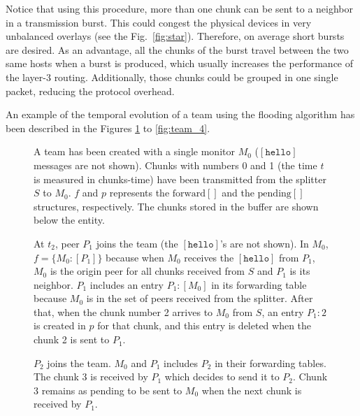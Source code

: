 Notice that using this procedure, more than one chunk can be sent to a
neighbor in a transmission burst. This could congest the physical
devices in very unbalanced overlays (see the
Fig.~\ref{fig:star}). Therefore, on average short bursts are
desired. As an advantage, all the chunks of the burst travel between
the two same hosts when a burst is produced, which usually increases
the performance of the layer-3 routing. Additionally, those chunks
could be grouped in one single packet, reducing the protocol overhead.

An example of the temporal evolution of a team using the flooding
algorithm has been described in the Figures \ref{fig:team_0} to
\ref{fig:team_4}.

\begin{figure}
  \caption{A team has been created with a single monitor $M_0$
    ($[\mathtt{hello}]$ messages are not shown). Chunks with numbers 0
    and 1 (the time $t$ is measured in chunks-time) have been
    transmitted from the splitter $S$ to $M_0$. $f$ and $p$ represents
    the $\text{forward}[]$ and the $\text{pending}[]$ structures,
    respectively. The chunks stored in the buffer are shown below the
    entity.} %
  \label{fig:team_0}
\end{figure}

\begin{figure}
  \caption{At $t_2$, peer $P_1$ joins the team (the
    $[\mathtt{hello}]$'s are not shown). In $M_0$, $f=\{M_0:[P_1]\}$
    because when $M_0$ receives the $[\mathtt{hello}]$ from $P_1$,
    $M_0$ is the origin peer for all chunks received from $S$ and
    $P_1$ is its neighbor. $P_1$ includes an entry $P_1:[M_0]$ in its
    forwarding table because $M_0$ is in the set of peers received
    from the splitter. After that, when the chunk number 2 arrives to
    $M_0$ from $S$, an entry $P_1:2$ is created in $p$ for that
    chunk, and this entry is deleted when the chunk 2 is sent to
    $P_1$.} %
  \label{fig:team_1}
\end{figure}

\begin{figure}
  \caption{$P_2$ joins the team. $M_0$ and $P_1$ includes $P_2$ in
    their forwarding tables. The chunk 3 is received by $P_1$ which
    decides to send it to $P_2$. Chunk 3 remains as pending to be sent
    to $M_0$ when the next chunk is received by
    $P_1$.} %
  \label{fig:team_2}
\end{figure}
    
